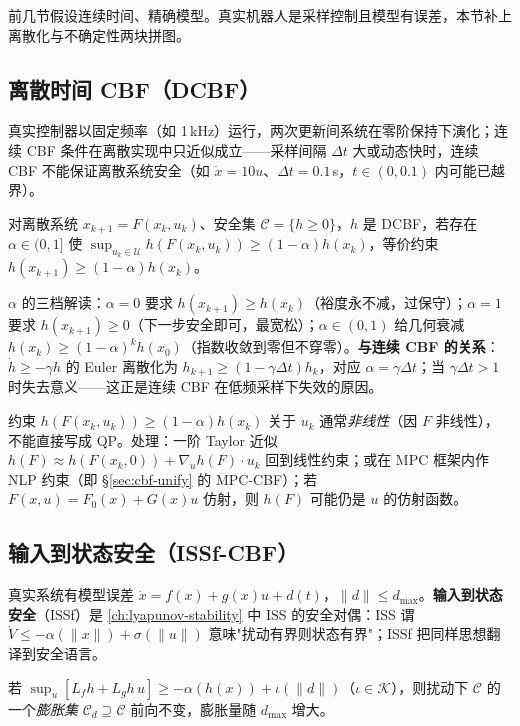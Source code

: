 前几节假设连续时间、精确模型。真实机器人是采样控制且模型有误差，本节补上离散化与不确定性两块拼图。

\subsection{离散时间 CBF（DCBF）}

真实控制器以固定频率（如 1\,kHz）运行，两次更新间系统在零阶保持下演化；连续 CBF 条件在离散实现中只近似成立——采样间隔 $\Delta t$ 大或动态快时，连续 CBF 不能保证离散系统安全（如 $\dot x=10u$、$\Delta t=0.1$\,s，$t\in(0,0.1)$ 内可能已越界）。

\begin{definition}\label{def:dcbf}
对离散系统 $x_{k+1}=F(x_k,u_k)$、安全集 $\mathcal C=\{h\ge0\}$，$h$ 是 DCBF，若存在 $\alpha\in(0,1]$ 使 $\sup_{u_k\in\mathcal U}h(F(x_k,u_k))\ge(1-\alpha)h(x_k)$，等价约束 $h(x_{k+1})\ge(1-\alpha)h(x_k)$。
\end{definition}

$\alpha$ 的三档解读：$\alpha=0$ 要求 $h(x_{k+1})\ge h(x_k)$（裕度永不减，过保守）；$\alpha=1$ 要求 $h(x_{k+1})\ge0$（下一步安全即可，最宽松）；$\alpha\in(0,1)$ 给几何衰减 $h(x_k)\ge(1-\alpha)^k h(x_0)$（指数收敛到零但不穿零）。\textbf{与连续 CBF 的关系}：$\dot h\ge-\gamma h$ 的 Euler 离散化为 $h_{k+1}\ge(1-\gamma\Delta t)h_k$，对应 $\alpha=\gamma\Delta t$；当 $\gamma\Delta t>1$ 时失去意义——这正是连续 CBF 在低频采样下失效的原因。

\begin{remark}
约束 $h(F(x_k,u_k))\ge(1-\alpha)h(x_k)$ 关于 $u_k$ 通常\emph{非线性}（因 $F$ 非线性），不能直接写成 QP。处理：一阶 Taylor 近似 $h(F)\approx h(F(x_k,0))+\nabla_uh(F)\cdot u_k$ 回到线性约束；或在 MPC 框架内作 NLP 约束（即 §\ref{sec:cbf-unify} 的 MPC-CBF）；若 $F(x,u)=F_0(x)+G(x)u$ 仿射，则 $h(F)$ 可能仍是 $u$ 的仿射函数。
\end{remark}

\subsection{输入到状态安全（ISSf-CBF）}

真实系统有模型误差 $\dot x=f(x)+g(x)u+d(t)$，$\|d\|\le d_{\max}$。\textbf{输入到状态安全}（ISSf）是 \cref{ch:lyapunov-stability} 中 ISS 的安全对偶：ISS 谓 $\dot V\le-\alpha(\|x\|)+\sigma(\|u\|)$ 意味"扰动有界则状态有界"；ISSf 把同样思想翻译到安全语言。

\begin{theorem}\label{thm:issf}
若 $\sup_u[L_fh+L_gh\,u]\ge-\alpha(h(x))+\iota(\|d\|)$（$\iota\in\mathcal K$），则扰动下 $\mathcal C$ 的一个\emph{膨胀集} $\mathcal C_d\supseteq\mathcal C$ 前向不变，膨胀量随 $d_{\max}$ 增大。
\end{theorem}

